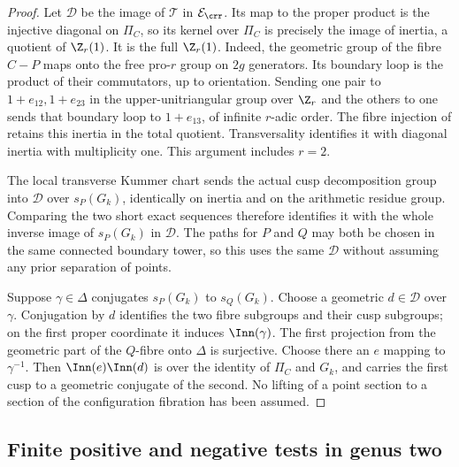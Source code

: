 \begin{proof}
Let $\mathcal D$ be the image of $\mathcal T$ in
$\mathcal E_{\crr}$. Its map to the proper product is the injective
diagonal on $\Pi_C$, so its kernel over $\Pi_C$ is precisely the
image of inertia, a quotient of $\Z_r(1)$. It is the full
$\Z_r(1)$. Indeed, the geometric group of the fibre $C-P$ maps
onto the free pro-$r$ group on $2g$ generators. Its boundary loop is
the product of their commutators, up to orientation. Sending one pair
to $1+e_{12},1+e_{23}$ in the upper-unitriangular group over $\Z_r$
and the others to one sends that boundary loop to $1+e_{13}$, of
infinite $r$-adic order. The fibre injection of
 retains this inertia in the total quotient.
Transversality identifies it with diagonal inertia with multiplicity
one. This argument includes $r=2$.

The local transverse Kummer chart sends the actual cusp decomposition
group into $\mathcal D$ over $s_P(G_k)$, identically on inertia and
on the arithmetic residue group. Comparing the two short exact
sequences therefore identifies it with the whole inverse image of
$s_P(G_k)$ in $\mathcal D$. The paths for $P$ and $Q$ may both be
chosen in the same connected boundary tower, so this uses the same
$\mathcal D$ without assuming any prior separation of points.

Suppose $\gamma\in\Delta$ conjugates $s_P(G_k)$ to $s_Q(G_k)$.
Choose a geometric $d\in\mathcal D$ over $\gamma$. Conjugation by
$d$ identifies the two fibre subgroups and their cusp subgroups; on
the first proper coordinate it induces $\Inn(\gamma)$. The first
projection from the geometric part of the $Q$-fibre onto $\Delta$
is surjective. Choose there an $e$ mapping to $\gamma^{-1}$. Then
$\Inn(e)\Inn(d)$ is over the identity of $\Pi_C$ and $G_k$, and
carries the first cusp to a geometric conjugate of the second. No
lifting of a point section to a section of the configuration fibration
has been assumed.
\end{proof}

\subsection{Finite positive and negative tests in genus two}

